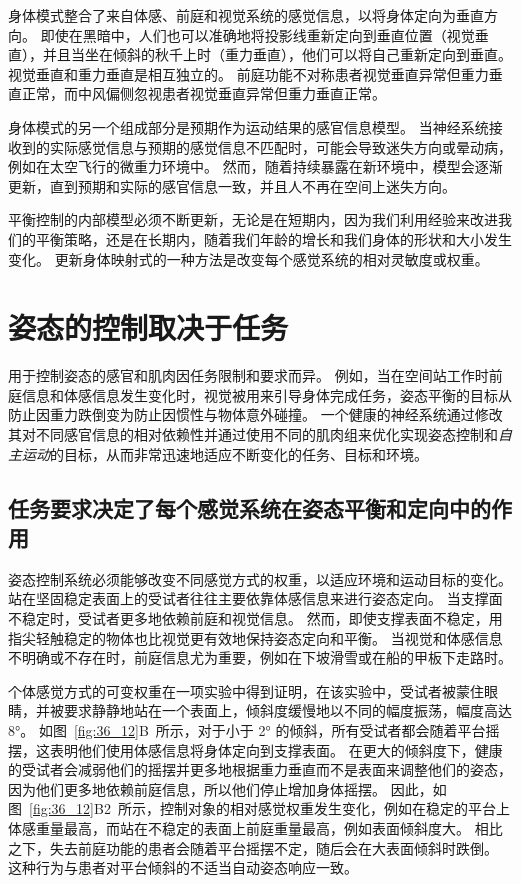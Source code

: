 身体模式整合了来自体感、前庭和视觉系统的感觉信息，以将身体定向为垂直方向。
即使在黑暗中，人们也可以准确地将投影线重新定向到垂直位置（视觉垂直），并且当坐在倾斜的秋千上时（重力垂直），他们可以将自己重新定向到垂直。
视觉垂直和重力垂直是相互独立的。
前庭功能不对称患者视觉垂直异常但重力垂直正常，而中风偏侧忽视患者视觉垂直异常但重力垂直正常。


身体模式的另一个组成部分是预期作为运动结果的感官信息模型。
当神经系统接收到的实际感觉信息与预期的感觉信息不匹配时，可能会导致迷失方向或晕动病，例如在太空飞行的微重力环境中。
然而，随着持续暴露在新环境中，模型会逐渐更新，直到预期和实际的感官信息一致，并且人不再在空间上迷失方向。


平衡控制的内部模型必须不断更新，无论是在短期内，因为我们利用经验来改进我们的平衡策略，还是在长期内，随着我们年龄的增长和我们身体的形状和大小发生变化。
更新身体映射式的一种方法是改变每个感觉系统的相对灵敏度或权重。



\section{姿态的控制取决于任务}

用于控制姿态的感官和肌肉因任务限制和要求而异。
例如，当在空间站工作时前庭信息和体感信息发生变化时，视觉被用来引导身体完成任务，姿态平衡的目标从防止因重力跌倒变为防止因惯性与物体意外碰撞。
一个健康的神经系统通过修改其对不同感官信息的相对依赖性并通过使用不同的肌肉组来优化实现姿态控制和\textit{自主运动}的目标，从而非常迅速地适应不断变化的任务、目标和环境。



\subsection{任务要求决定了每个感觉系统在姿态平衡和定向中的作用}

姿态控制系统必须能够改变不同感觉方式的权重，以适应环境和运动目标的变化。
站在坚固稳定表面上的受试者往往主要依靠体感信息来进行姿态定向。
当支撑面不稳定时，受试者更多地依赖前庭和视觉信息。
然而，即使支撑表面不稳定，用指尖轻触稳定的物体也比视觉更有效地保持姿态定向和平衡。
当视觉和体感信息不明确或不存在时，前庭信息尤为重要，例如在下坡滑雪或在船的甲板下走路时。


个体感觉方式的可变权重在一项实验中得到证明，在该实验中，受试者被蒙住眼睛，并被要求静静地站在一个表面上，倾斜度缓慢地以不同的幅度振荡，幅度高达 8°。
如图~\ref{fig:36_12}B~所示，对于小于 2° 的倾斜，所有受试者都会随着平台摇摆，这表明他们使用体感信息将身体定向到支撑表面。
在更大的倾斜度下，健康的受试者会减弱他们的摇摆并更多地根据重力垂直而不是表面来调整他们的姿态，因为他们更多地依赖前庭信息，所以他们停止增加身体摇摆。
因此，如图~\ref{fig:36_12}B2~所示，控制对象的相对感觉权重发生变化，例如在稳定的平台上体感重量最高，而站在不稳定的表面上前庭重量最高，例如表面倾斜度大。
相比之下，失去前庭功能的患者会随着平台摇摆不定，随后会在大表面倾斜时跌倒。
这种行为与患者对平台倾斜的不适当自动姿态响应一致。


